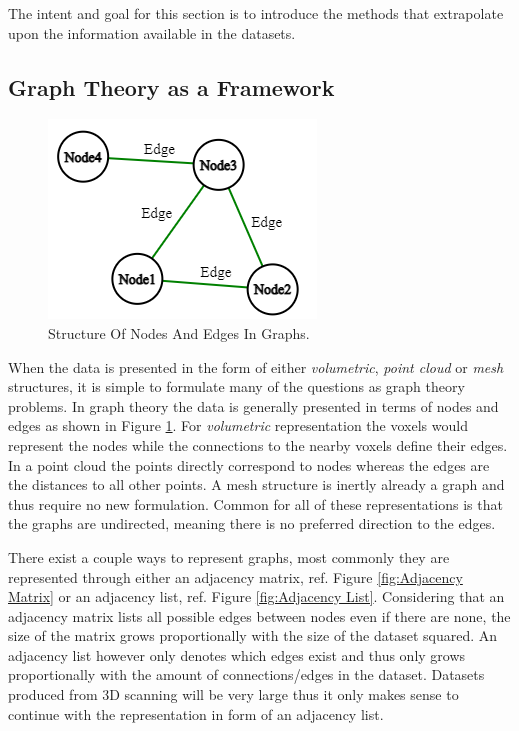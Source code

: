 \documentclass[%
]{USN-MSc}
\begin{document}
The intent and goal for this section is to introduce the methods that extrapolate upon the information available in the datasets. 

\subsection{Graph Theory as a Framework}
\label{sub:Graph Theory}
\begin{figure}
    \includegraphics[width=0.9\linewidth]{fig/Node Edge.png}
    \caption{Structure Of Nodes And Edges In Graphs.}
    \label{fig:Nodes and Edges}
\end{figure}
When the data is presented in the form of either \textit{volumetric}, \textit{point cloud} or \textit{mesh} structures, it is simple to formulate many of the questions as graph theory problems. In graph theory the data is generally presented in terms of nodes and edges as shown in Figure \ref{fig:Nodes and Edges}. For \textit{volumetric} representation the voxels would represent the nodes while the connections to the nearby voxels define their edges. In a point cloud the points directly correspond to nodes whereas the edges are the distances to all other points. A mesh structure is inertly already a graph and thus require no new formulation. Common for all of these representations is that the graphs are undirected, meaning there is no preferred direction to the edges.


There exist a couple ways to represent graphs, most commonly they are represented through either an adjacency matrix, ref. Figure \ref{fig:Adjacency Matrix} or an adjacency list, ref. Figure \ref{fig:Adjacency List}. Considering that an adjacency matrix lists all possible edges between nodes even if there are none, the size of the matrix grows proportionally with the size of the dataset squared. An adjacency list however only denotes which edges exist and thus only grows proportionally with the amount of connections/edges in the dataset. Datasets produced from 3D scanning will be very large thus it only makes sense to continue with the representation in form of an adjacency list.
\end{document}

